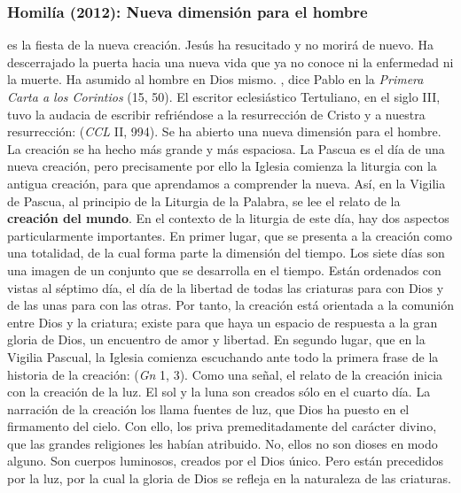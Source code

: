 \newpage 

\subsubsection{Homilía (2012): Nueva dimensión para el hombre}


\begin{body}
 es la fiesta de la nueva creación. Jesús ha resucitado y no morirá de nuevo. Ha descerrajado la puerta hacia una nueva vida que ya no conoce ni la enfermedad ni la muerte. Ha asumido al hombre en Dios mismo. , dice Pablo en la \textit{Primera Carta a los Corintios} (15, 50). El escritor eclesiástico Tertuliano, en el siglo III, tuvo la audacia de escribir refriéndose a la resurrección de Cristo y a nuestra resurrección:  (\textit{CCL} II, 994). Se ha abierto una nueva dimensión para el hombre. La creación se ha hecho más grande y más espaciosa. La Pascua es el día de una nueva creación, pero precisamente por ello la Iglesia comienza la liturgia con la antigua creación, para que aprendamos a comprender la nueva. Así, en la Vigilia de Pascua, al principio de la Liturgia de la Palabra, se lee el relato de la \textbf{creación del mundo}. En el contexto de la liturgia de este día, hay dos aspectos particularmente importantes. En primer lugar, que se presenta a la creación como una totalidad, de la cual forma parte la dimensión del tiempo. Los siete días son una imagen de un conjunto que se desarrolla en el tiempo. Están ordenados con vistas al séptimo día, el día de la libertad de todas las criaturas para con Dios y de las unas para con las otras. Por tanto, la creación está orientada a la comunión entre Dios y la criatura; existe para que haya un espacio de respuesta a la gran gloria de Dios, un encuentro de amor y libertad. En segundo lugar, que en la Vigilia Pascual, la Iglesia comienza escuchando ante todo la primera frase de la historia de la creación:  (\textit{Gn} 1, 3). Como una señal, el relato de la creación inicia con la creación de la luz. El sol y la luna son creados sólo en el cuarto día. La narración de la creación los llama fuentes de luz, que Dios ha puesto en el firmamento del cielo. Con ello, los priva premeditadamente del carácter divino, que las grandes religiones les habían atribuido. No, ellos no son dioses en modo alguno. Son cuerpos luminosos, creados por el Dios único. Pero están precedidos por la luz, por la cual la gloria de Dios se refleja en la naturaleza de las criaturas.


\end{body}
